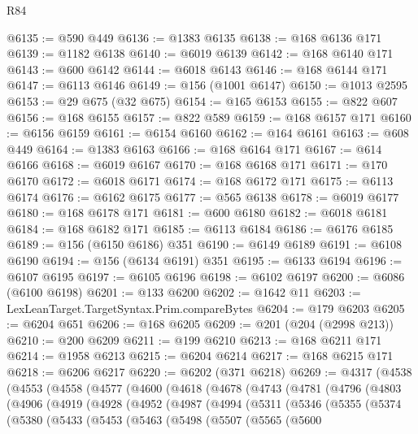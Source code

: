 \begin{lexlean}{R84}
\begin{coremodule}
@6135 := @590 @449
@6136 := @1383 @6135
@6138 := @168 @6136 @171
@6139 := @1182 @6138
@6140 := @6019 @6139
@6142 := @168 @6140 @171
@6143 := @600 @6142
@6144 := @6018 @6143
@6146 := @168 @6144 @171
@6147 := @6113 @6146
@6149 := @156 (@1001 @6147)
@6150 := @1013 @2595
@6153 := @29 @675 (@32 @675)
@6154 := @165 @6153
@6155 := @822 @607
@6156 := @168 @6155
@6157 := @822 @589
@6159 := @168 @6157 @171
@6160 := @6156 @6159
@6161 := @6154 @6160
@6162 := @164 @6161
@6163 := @608 @449
@6164 := @1383 @6163
@6166 := @168 @6164 @171
@6167 := @614 @6166
@6168 := @6019 @6167
@6170 := @168 @6168 @171
@6171 := @170 @6170
@6172 := @6018 @6171
@6174 := @168 @6172 @171
@6175 := @6113 @6174
@6176 := @6162 @6175
@6177 := @565 @6138
@6178 := @6019 @6177
@6180 := @168 @6178 @171
@6181 := @600 @6180
@6182 := @6018 @6181
@6184 := @168 @6182 @171
@6185 := @6113 @6184
@6186 := @6176 @6185
@6189 := @156 (@6150 @6186) @351
@6190 := @6149 @6189
@6191 := @6108 @6190
@6194 := @156 (@6134 @6191) @351
@6195 := @6133 @6194
@6196 := @6107 @6195
@6197 := @6105 @6196
@6198 := @6102 @6197
@6200 := @6086 (@6100 @6198)
@6201 := @133 @6200
@6202 := @1642 @11
@6203 := LexLeanTarget.TargetSyntax.Prim.compareBytes
@6204 := @179 @6203
@6205 := @6204 @651
@6206 := @168 @6205
@6209 := @201 (@204 (@2998 @213))
@6210 := @200 @6209
@6211 := @199 @6210
@6213 := @168 @6211 @171
@6214 := @1958 @6213
@6215 := @6204 @6214
@6217 := @168 @6215 @171
@6218 := @6206 @6217
@6220 := @6202 (@371 @6218)
@6269 := @4317
    (@4538
      (@4553
        (@4558
          (@4577
            (@4600
              (@4618
                (@4678
                  (@4743
                    (@4781
                      (@4796
                        (@4803
                          (@4906
                            (@4919
                              (@4928
                                (@4952
                                  (@4987
                                    (@4994
                                      (@5311
                                        (@5346
                                          (@5355
                                            (@5374
                                              (@5380
                                                (@5433
                                                  (@5453
                                                    (@5463
                                                      (@5498
                                                        (@5507
                                                          (@5565
                                                            (@5600

\end{coremodule}
\end{lexlean}
